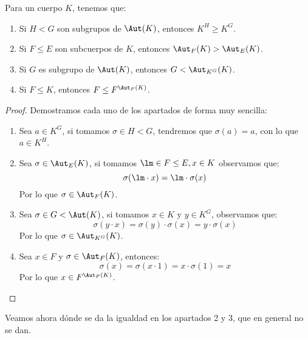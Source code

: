 \begin{lema}\label{lema:inclusiones}
    Para un cuerpo $K$, tenemos que:
    \begin{enumerate}
        \item Si $H< G$ son subgrupos de $\Aut(K)$, entonces $K^H \geq K^G$. %
        \item Si $F\leq E$ son subcuerpos de $K$, entonces $\Aut_F(K)> \Aut_E(K)$.
        \item Si $G$ es subgrupo de $\Aut(K)$, entonces $G< \Aut_{K^G}(K)$.
        \item Si $F\leq K$, entonces $F\leq F^{\Aut_F(K)}$.
    \end{enumerate}
    \begin{proof}
        Demostramos cada uno de los apartados de forma muy sencilla:
        \begin{enumerate}
            \item Sea $a\in K^G$, si tomamos $\sigma\in H< G$, tendremos que $\sigma(a) = a$, con lo que $a\in K^H$.
            \item Sea $\sigma\in \Aut_E(K)$, si tomamos $\lm \in F\leq E, x\in K$ observamos que:
                \begin{equation*}
                    \sigma(\lm \cdot x) = \lm\cdot \sigma(x)
                \end{equation*}
                Por lo que $\sigma\in \Aut_F(K)$.
            \item Sea $\sigma\in G< \Aut(K)$, si tomamos $x\in K$ y $y\in K^G$, observamos que:
                \begin{equation*}
                    \sigma(y\cdot x) = \sigma(y)\cdot \sigma(x) = y\cdot \sigma(x)
                \end{equation*}
                Por lo que $\sigma\in \Aut_{K^G}(K)$.
            \item Sea $x\in F$ y $\sigma \in \Aut_F(K)$, entonces:
                \begin{equation*}
                    \sigma(x) = \sigma(x\cdot 1) = x\cdot \sigma(1) = x
                \end{equation*}
                Por lo que $x\in F^{\Aut_F(K)}$.
        \end{enumerate}
    \end{proof}
\end{lema}

\noindent
Veamos ahora dónde se da la igualdad en los apartados 2 y 3, que en general no se dan.


